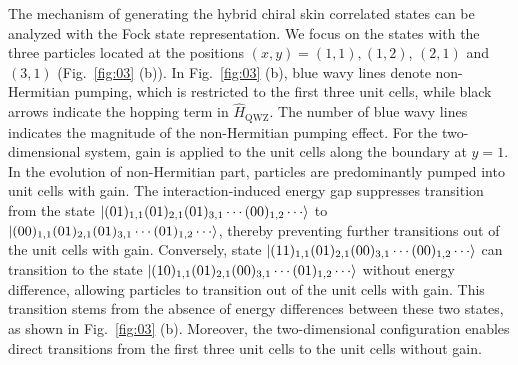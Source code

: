 \documentclass[longbibliography, aps, prx, amsmath, amssymb, amsfonts, twocolumn,superscriptaddress, footinbib]{revtex4-1}
\begin{document}
	The mechanism of generating the hybrid chiral skin correlated states can be analyzed with the Fock state representation. 
	We focus on the states with the three particles located at the positions $(x,y)=(1,1), (1,2)$, $(2,1)$ and $(3,1)$ (Fig.~\ref{fig:03} (b)).
	In Fig.~\ref{fig:03} (b), blue wavy lines denote non-Hermitian pumping, which is restricted to the first three unit cells, while black arrows indicate the hopping term in $\hat{H}_{\text{QWZ}}$. The number of blue wavy lines indicates the magnitude of the non-Hermitian pumping effect.
	For the two-dimensional system, gain is applied to the unit cells along the boundary at $y=1$.
	In the evolution of non-Hermitian part, particles are predominantly pumped into unit cells with gain. The interaction-induced energy gap suppresses transition from the state 
	$\ket{(01)_{1,1}(01)_{2,1}(01)_{3,1}\cdots(00)_{1,2}\cdots}$ to $\ket{(00)_{1,1}(01)_{2,1}(01)_{3,1}\cdots(01)_{1,2}\cdots}$,
	 thereby preventing further transitions out of the unit cells with gain. 
	Conversely, state $\ket{(11)_{1,1}(01)_{2,1}(00)_{3,1}\cdots(00)_{1,2}\cdots}$ can transition to the state $\ket{(10)_{1,1}(01)_{2,1}(00)_{3,1}\cdots(01)_{1,2}\cdots}$ 
	without energy difference, allowing particles to transition out of the unit cells with gain. This transition stems from the absence of energy differences between these two states, as shown in Fig.~\ref{fig:03} (b). 
	Moreover, the two-dimensional configuration enables direct transitions from the first three unit cells to the unit cells without gain.
\end{document}

